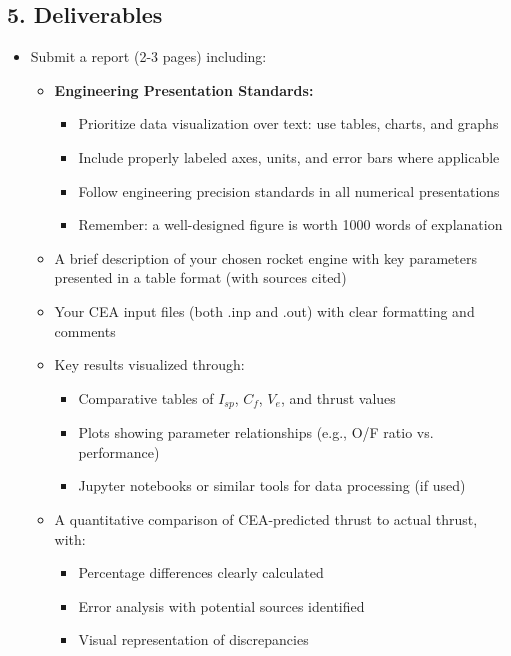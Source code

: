 \documentclass[12pt]{article}
\begin{document}
\subsection{5. Deliverables}
\begin{itemize}
    \item Submit a report (2-3 pages) including:
    \begin{itemize}
        \item \textbf{Engineering Presentation Standards:}
        \begin{itemize}
            \item Prioritize data visualization over text: use tables, charts, and graphs
            \item Include properly labeled axes, units, and error bars where applicable
            \item Follow engineering precision standards in all numerical presentations
            \item Remember: a well-designed figure is worth 1000 words of explanation
        \end{itemize}
        
        \item A brief description of your chosen rocket engine with key parameters presented in a table format (with sources cited)
        
        \item Your CEA input files (both .inp and .out) with clear formatting and comments
        
        \item Key results visualized through:
        \begin{itemize}
            \item Comparative tables of $I_{sp}$, $C_f$, $V_e$, and thrust values
            \item Plots showing parameter relationships (e.g., O/F ratio vs. performance)
            \item Jupyter notebooks or similar tools for data processing (if used)
        \end{itemize}
        
        \item A quantitative comparison of CEA-predicted thrust to actual thrust, with:
        \begin{itemize}
            \item Percentage differences clearly calculated
            \item Error analysis with potential sources identified
            \item Visual representation of discrepancies
        \end{itemize}
        

\end{itemize}
\end{itemize}
\end{document}
